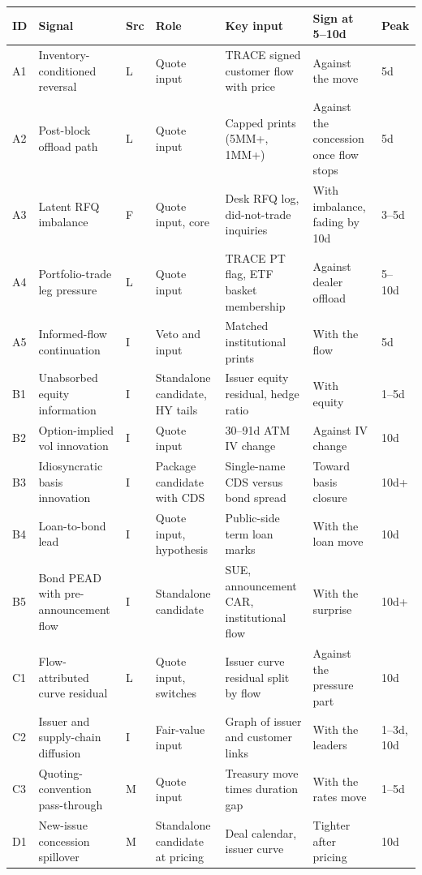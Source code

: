 \documentclass[11pt,letterpaper]{article}
\begin{document}
{\small
\begin{longtable}{@{}p{}p{}p{}p{}p{}p{}p{}@{}}
\toprule
ID & Signal & Src & Role & Key input & Sign at 5--10d & Peak \\
\midrule
\endhead
A1 & Inventory-conditioned reversal & L & Quote input & TRACE signed customer flow with price & Against the move & 5d \\
A2 & Post-block offload path & L & Quote input & Capped prints (5MM+, 1MM+) & Against the concession once flow stops & 5d \\
A3 & Latent RFQ imbalance & F & Quote input, core & Desk RFQ log, did-not-trade inquiries & With imbalance, fading by 10d & 3--5d \\
A4 & Portfolio-trade leg pressure & L & Quote input & TRACE PT flag, ETF basket membership & Against dealer offload & 5--10d \\
A5 & Informed-flow continuation & I & Veto and input & Matched institutional prints & With the flow & 5d \\
B1 & Unabsorbed equity information & I & Standalone candidate, HY tails & Issuer equity residual, hedge ratio & With equity & 1--5d \\
B2 & Option-implied vol innovation & I & Quote input & 30--91d ATM IV change & Against IV change & 10d \\
B3 & Idiosyncratic basis innovation & I & Package candidate with CDS & Single-name CDS versus bond spread & Toward basis closure & 10d+ \\
B4 & Loan-to-bond lead & I & Quote input, hypothesis & Public-side term loan marks & With the loan move & 10d \\
B5 & Bond PEAD with pre-announcement flow & I & Standalone candidate & SUE, announcement CAR, institutional flow & With the surprise & 10d+ \\
C1 & Flow-attributed curve residual & L & Quote input, switches & Issuer curve residual split by flow & Against the pressure part & 10d \\
C2 & Issuer and supply-chain diffusion & I & Fair-value input & Graph of issuer and customer links & With the leaders & 1--3d, 10d \\
C3 & Quoting-convention pass-through & M & Quote input & Treasury move times duration gap & With the rates move & 1--5d \\
D1 & New-issue concession spillover & M & Standalone candidate at pricing & Deal calendar, issuer curve & Tighter after pricing & 10d \\

\end{longtable}}
\end{document}
